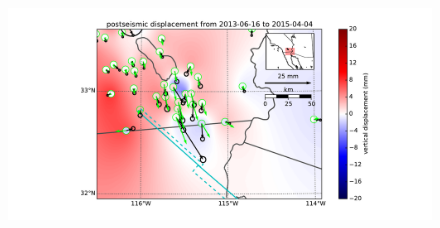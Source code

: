 \documentclass[12pt]{article}
\begin{document}
\begin{figure}
\includegraphics[scale=0.6]{Figures/near_field_data_4}
\centering 
\caption{}
\label{fig:NearField4}
\end{figure}
\end{document}
